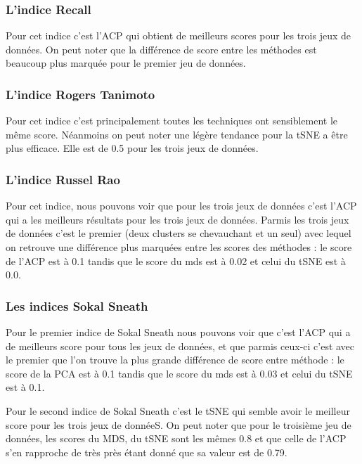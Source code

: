 \subsubsection{L'indice Recall}
Pour cet indice c'est l'ACP qui obtient de meilleurs scores pour les trois jeux de données.
On peut noter que la différence de score entre les méthodes est beaucoup plus marquée pour le premier jeu de données.


\subsubsection{L'indice Rogers Tanimoto}
Pour cet indice c'est principalement toutes les techniques ont sensiblement le même score. Néanmoins on peut noter une légère tendance 
pour la tSNE a être plus efficace. Elle est de 0.5 pour les trois jeux de données.

\subsubsection{L'indice Russel Rao}
Pour cet indice, nous pouvons voir que pour les trois jeux de données c'est l'ACP qui a les meilleurs résultats pour les trois jeux de données.
Parmis les trois jeux de données c'est le premier (deux clusters se chevauchant et un seul) avec lequel on retrouve une différence plus marquées entre 
les scores des méthodes : le score de l'ACP est à 0.1 tandis que le score du mds est à 0.02 et celui du tSNE est à 0.0.

\subsubsection{Les indices Sokal Sneath}

Pour le premier indice de Sokal Sneath nous pouvons voir que c'est l'ACP qui a de meilleurs score pour tous les jeux de données, et que parmis ceux-ci
c'est avec le premier que l'on trouve la plus grande différence de score entre méthode : le score de la PCA est à 0.1 tandis que le score du mds est à 0.03 et celui du tSNE est à 0.1.

Pour le second indice de Sokal Sneath c'est le tSNE qui semble avoir le meilleur score pour les trois jeux de donnéeS.
On peut noter que pour le troisième jeu de données, les scores du MDS, du tSNE sont les mêmes 0.8 et que celle de l'ACP s'en rapproche de très près étant donné que sa valeur est de 0.79.

